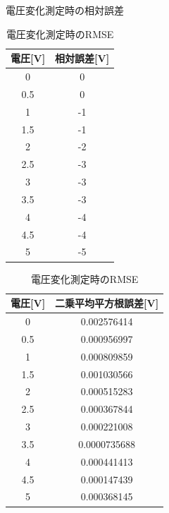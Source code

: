 \begin{table}[h]
\begin{minipage}[c]{0.5\hsize}
\centering
\caption{電圧変化測定時の相対誤差}
\label{tab:fivegosa}
\begin{tabular}{cc}
\hline
電圧[\rm{V}]  & 相対誤差[\rm{V}]\\
\hline
0   & 0  \\
0.5 & 0  \\
1   & -1 \\
1.5 & -1 \\
2   & -2 \\
2.5 & -3 \\
3   & -3 \\
3.5 & -3 \\
4   & -4 \\
4.5 & -4 \\
5   & -5 \\
\hline
\end{tabular}
\end{minipage}
\begin{minipage}[c]{0.5\hsize}
\centering
\caption{電圧変化測定時のRMSE}
\label{tab:RMSE}
\begin{tabular}{cc}
\hline
電圧[\rm{V}]  & 二乗平均平方根誤差[\rm{V}]  \\
\hline
0   & 0.002576414 \\
0.5 & 0.000956997 \\
1   & 0.000809859 \\
1.5 & 0.001030566 \\
2   & 0.000515283 \\
2.5 & 0.000367844 \\
3   & 0.000221008 \\
3.5 & 0.0000735688 \\
4   & 0.000441413 \\
4.5 & 0.000147439 \\
5   & 0.000368145\\
\hline
\end{tabular}
\end{minipage}
\end{table}